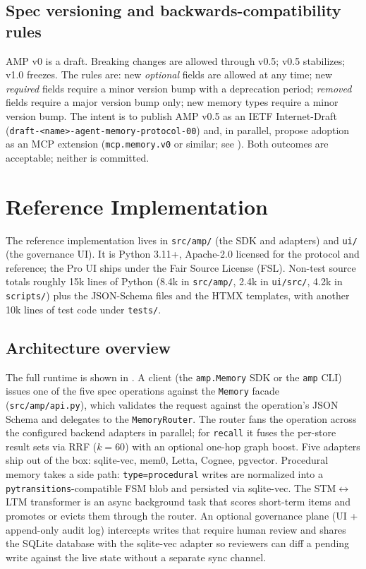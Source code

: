 \documentclass[11pt,letterpaper,twocolumn]{article}
\begin{document}
\subsection{Spec versioning and backwards-compatibility rules}
\label{sec:spec-versioning}

AMP v0 is a draft. Breaking changes are allowed through v0.5; v0.5 stabilizes; v1.0 freezes. The rules are: new \emph{optional} fields are allowed at any time; new \emph{required} fields require a minor version bump with a deprecation period; \emph{removed} fields require a major version bump only; new memory types require a minor version bump. The intent is to publish AMP v0.5 as an IETF Internet-Draft (\texttt{draft-<name>-agent-memory-protocol-00}) and, in parallel, propose adoption as an MCP extension (\texttt{mcp.memory.v0} or similar; see ). Both outcomes are acceptable; neither is committed.

\section{Reference Implementation}
\label{sec:impl}

The reference implementation lives in \texttt{src/amp/} (the SDK and adapters) and \texttt{ui/} (the governance UI). It is Python 3.11+, Apache-2.0 licensed for the protocol and reference; the Pro UI ships under the Fair Source License (FSL). Non-test source totals roughly 15k lines of Python (8.4k in \texttt{src/amp/}, 2.4k in \texttt{ui/src/}, 4.2k in \texttt{scripts/}) plus the JSON-Schema files and the HTMX templates, with another 10k lines of test code under \texttt{tests/}.

\subsection{Architecture overview}
\label{sec:impl-arch}

The full runtime is shown in . A client (the \texttt{amp.Memory} SDK or the \texttt{amp} CLI) issues one of the five spec operations against the \texttt{Memory} facade (\texttt{src/amp/api.py}), which validates the request against the operation's JSON Schema and delegates to the \texttt{MemoryRouter}. The router fans the operation across the configured backend adapters in parallel; for \texttt{recall} it fuses the per-store result sets via RRF ($k=60$) with an optional one-hop graph boost. Five adapters ship out of the box: sqlite-vec, mem0, Letta, Cognee, pgvector. Procedural memory takes a side path: \texttt{type=procedural} writes are normalized into a \texttt{pytransitions}-compatible FSM blob and persisted via sqlite-vec. The STM$\leftrightarrow$LTM transformer is an async background task that scores short-term items and promotes or evicts them through the router. An optional governance plane (UI + append-only audit log) intercepts writes that require human review and shares the SQLite database with the sqlite-vec adapter so reviewers can diff a pending write against the live state without a separate sync channel.
\end{document}
